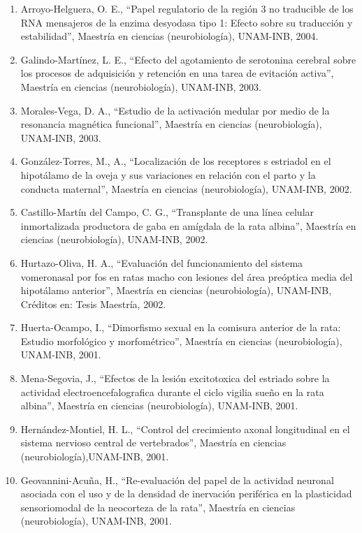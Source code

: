 \begin{enumerate}
\item  Arroyo-Helguera, O. E., “Papel regulatorio de la región 3 no traducible de los RNA mensajeros de la enzima desyodasa 
tipo 
1: Efecto sobre su traducción y estabilidad”, Maestría en ciencias (neurobiología), UNAM-INB, 
2004.

\item  Galindo-Martínez, L. E., “Efecto del agotamiento de serotonina cerebral sobre los procesos de adquisición y retención en 
una tarea de evitación activa”, Maestría en ciencias (neurobiología), UNAM-INB, 2003.

\item  Morales-Vega, D. A., “Estudio de la activación medular por medio de la resonancia magnética funcional”, Maestría en 
ciencias (neurobiología), UNAM-INB, 2003.

\item  González-Torres, M., A., “Localización de los receptores s estriadol en el hipotálamo de la oveja y sus variaciones en 
relación con el parto y la conducta maternal”, Maestría en ciencias (neurobiología), UNAM-INB,
2002.

\item  Castillo-Martín del Campo, C. G., “Transplante de una línea celular inmortalizada productora de gaba en amígdala de la 
rata 
albina”, Maestría en ciencias (neurobiología), UNAM-INB, 2002.

\item  Hurtazo-Oliva, H. A., “Evaluación del funcionamiento del sistema vomeronasal por fos en ratas macho con lesiones del 
área 
preóptica media del hipotálamo anterior”, Maestría en ciencias (neurobiología), UNAM-INB, Créditos en: Tesis Maestría, 2002.

\item  Huerta-Ocampo, I., “Dimorfismo sexual en la comisura anterior de la rata: Estudio morfológico y morfométrico”, Maestría 
en 
ciencias (neurobiología), UNAM-INB, 2001.

\item  Mena-Segovia, J., “Efectos de la lesión excitotoxica del estriado sobre la actividad electroencefalografica durante el 
ciclo vigilia sueño en la rata albina”, Maestría en ciencias (neurobiología), UNAM-INB, 2001.

\item  Hernández-Montiel, H. L., “Control del crecimiento axonal longitudinal en el sistema nervioso central de vertebrados”, 
Maestría en ciencias (neurobiología),UNAM-INB, 2001.

\item  Geovannini-Acuña, H., “Re-evaluación del papel de la actividad neuronal asociada con el uso y de la densidad de 
inervación 
periférica en la plasticidad sensoriomodal de la neocorteza de la rata”, Maestría en ciencias (neurobiología), UNAM-INB, 
2001.


\end{enumerate}
